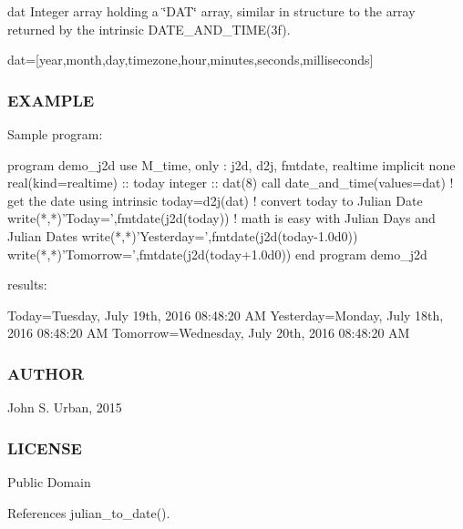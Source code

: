 dat Integer array holding a \char`\"{}\+D\+A\+T\char`\"{} array, similar in structure to the array returned by the intrinsic D\+A\+T\+E\+\_\+\+A\+N\+D\+\_\+\+T\+I\+M\+E(3f).

dat=\mbox{[}year,month,day,timezone,hour,minutes,seconds,milliseconds\mbox{]}

\subsubsection*{E\+X\+A\+M\+P\+LE}

\begin{DoxyVerb}Sample program:

 program demo_j2d
 use M_time, only : j2d, d2j, fmtdate, realtime
 implicit none
 real(kind=realtime) :: today
 integer :: dat(8)
    call date_and_time(values=dat) ! get the date using intrinsic
    today=d2j(dat)                  ! convert today to Julian Date
    write(*,*)'Today=',fmtdate(j2d(today))
    ! math is easy with Julian Days and Julian Dates
    write(*,*)'Yesterday=',fmtdate(j2d(today-1.0d0))
    write(*,*)'Tomorrow=',fmtdate(j2d(today+1.0d0))
 end program demo_j2d

results:

 Today=Tuesday, July 19th, 2016 08:48:20 AM
 Yesterday=Monday, July 18th, 2016 08:48:20 AM
 Tomorrow=Wednesday, July 20th, 2016 08:48:20 AM
\end{DoxyVerb}
 \subsubsection*{A\+U\+T\+H\+OR}

John S. Urban, 2015 \subsubsection*{L\+I\+C\+E\+N\+SE}

Public Domain 

References julian\+\_\+to\+\_\+date().

